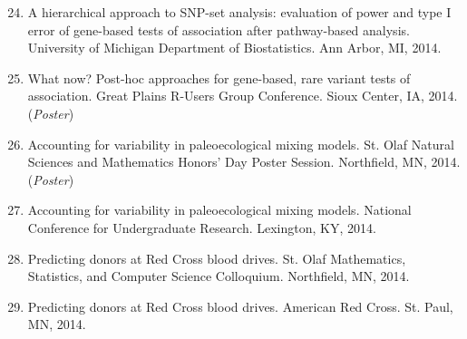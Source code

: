 \documentclass[margin]{res}
\newenvironment{benumerate}[1]{
    \let\oldItem\item
    \def\item{\addtocounter{enumi}{-2}\oldItem}
    
    \begin{enumerate}
    \setcounter{enumi}{#1}
    \addtocounter{enumi}{1}
}{
    \end{enumerate}
}
\begin{document}
\begin{resume}
\begin{benumerate}{23}
\item %
A hierarchical approach to SNP-set analysis: evaluation of power and type I error of gene-based tests of association after pathway-based analysis. University of Michigan Department of Biostatistics. Ann Arbor, MI, 2014.


\item %
What now? Post-hoc approaches for gene-based, rare variant tests of association. Great Plains R-Users Group Conference. Sioux Center, IA, 2014. (\textit{Poster})

\item %
Accounting for variability in paleoecological mixing models. St. Olaf Natural Sciences and Mathematics Honors’ Day Poster Session. Northfield, MN, 2014. (\textit{Poster})


\item %
Accounting for variability in paleoecological mixing models. National Conference for Undergraduate Research. Lexington, KY, 2014.

\item %
Predicting donors at Red Cross blood drives. St. Olaf Mathematics, Statistics, and Computer Science Colloquium. Northfield, MN, 2014.

\item %
Predicting donors at Red Cross blood drives. American Red Cross. St. Paul, MN, 2014.



\end{benumerate}
\end{resume}
\end{document}
